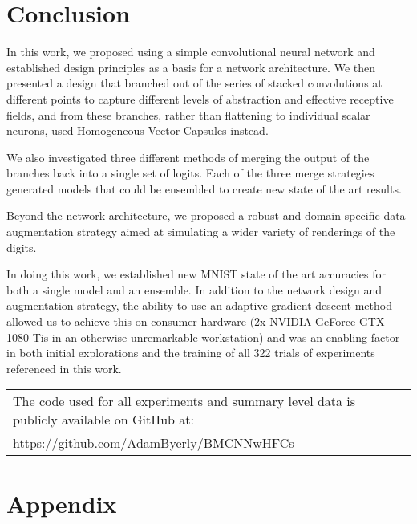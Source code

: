 \documentclass{article}
\begin{document}
\section{Conclusion}\label{sec:conclusion}

In this work, we proposed using a simple convolutional neural network and established design principles as a basis for a network architecture.  We then presented a design that branched out of the series of stacked convolutions at different points to capture different levels of abstraction and effective receptive fields, and from these branches, rather than flattening to individual scalar neurons, used Homogeneous Vector Capsules instead.

We also investigated three different methods of merging the output of the branches back into a single set of logits.  Each of the three merge strategies generated models that could be ensembled to create new state of the art results.

Beyond the network architecture, we proposed a robust and domain specific data augmentation strategy aimed at simulating a wider variety of renderings of the digits.

In doing this work, we established new MNIST state of the art accuracies for both a single model and an ensemble.  In addition to the network design and augmentation strategy, the ability to use an adaptive gradient descent method~\cite{Byerly2019} allowed us to achieve this on consumer hardware (2x NVIDIA GeForce GTX 1080 Tis in an otherwise unremarkable workstation) and was an enabling factor in both initial explorations and the training of all 322 trials of experiments referenced in this work.

\printbibliography{}

\bigskip

\begin{tabularx}{\textwidth}{@{}l@{}}
  The code used for all experiments and summary level data is publicly available on GitHub at: \\
  \href{https://github.com/AdamByerly/BMCNNwHFCs}{https://github.com/AdamByerly/BMCNNwHFCs} \\
\end{tabularx}

\bigskip

\appendix

\section{Appendix}\label{sec:appendix}
\end{document}
